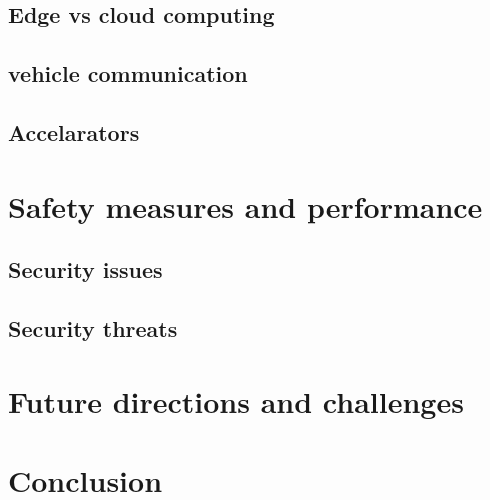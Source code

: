 \documentclass[10pt,oneside,english,a4paper]{article}
\begin{document}
\subsection{Edge vs cloud computing}

\subsection{vehicle communication}

\subsection{Accelarators}




\section{Safety measures and performance} \label{safety}

\subsection{Security issues}

\subsection{Security threats}


\section{Future directions and challenges} \label{future}




\section{Conclusion} \label{conclusion}





\newpage

\end{document}
